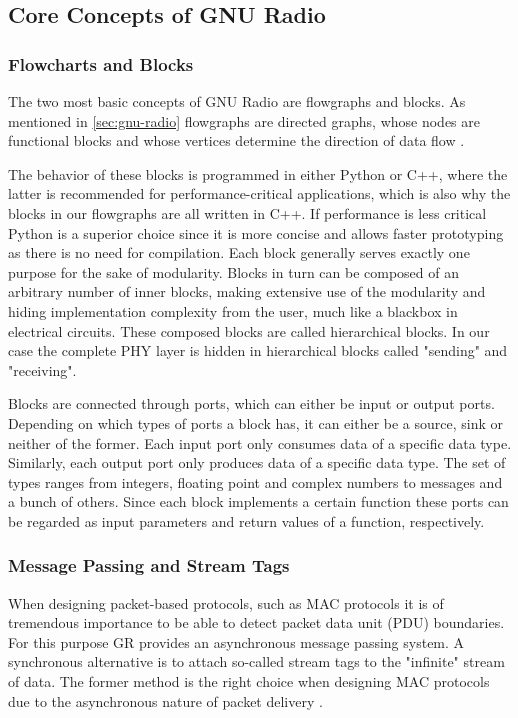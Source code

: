 \subsection{Core Concepts of GNU Radio}

\subsubsection{Flowcharts and Blocks}

The two most basic concepts of GNU Radio are flowgraphs and blocks. As mentioned in \ref{sec:gnu-radio} flowgraphs are directed graphs, whose nodes are functional blocks and whose vertices determine the direction of data flow \cite{GR1}. 

The behavior of these blocks is programmed in either Python or C++, where the latter is recommended for performance-critical applications, which is also why the blocks in our flowgraphs are all written in C++. If performance is less critical Python is a superior choice since it is more concise and allows faster prototyping as there is no need for compilation. Each block generally serves exactly one purpose for the sake of modularity. Blocks in turn can be composed of an arbitrary number of inner blocks, making extensive use of the modularity and hiding implementation complexity from the user, much like a blackbox in electrical circuits. These composed blocks are called hierarchical blocks. In our case the complete PHY layer is hidden in hierarchical blocks called "sending" and "receiving".

Blocks are connected through ports, which can either be input or output ports. Depending on which types of ports a block has, it can either be a source, sink or neither of the former. 
Each input port only consumes data of a specific data type. Similarly, each output port only produces data of a specific data type. The set of types ranges from integers, floating point and complex numbers to messages and a bunch of others. Since each block implements a certain function these ports can be regarded as input parameters and return values of a function, respectively.

\subsubsection{Message Passing and Stream Tags}

When designing packet-based protocols, such as MAC protocols it is of tremendous importance to be able to detect packet data unit (PDU) boundaries. For this purpose GR provides an asynchronous message passing system. A synchronous alternative is to attach so-called stream tags to the "infinite" stream of data. The former method is the right choice when designing MAC protocols due to the asynchronous nature of packet delivery \cite{GR1}\cite{GRDocs}.  

